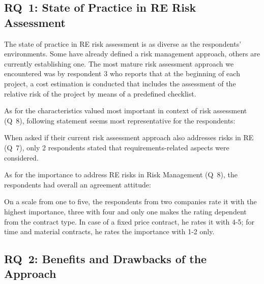 \documentclass[lnbip]{svmultln}
\begin{document}
\subsection{RQ~1: State of Practice in RE Risk Assessment}
The state of practice in RE risk assessment is as diverse as the respondents' environments. Some have already defined a risk management approach, others are currently establishing one. The most mature risk assessment approach we encountered was by respondent 3 who reports that at the beginning of each project, a cost estimation is conducted that includes the assessment of the relative risk of the project by means of a predefined checklist. 

As for the characteristics valued most important in context of risk assessment (Q~8), following statement seems most representative for the respondents:

\begin{center}
\setlength\fboxsep{0pt}
  \setlength\fboxrule{0pt}
\colorbox{lightgray}{
}
\end{center}

When asked if their current risk assessment approach also addresses risks in RE (Q~7), only 2 respondents stated that requirements-related aspects were considered. 


As for the importance to address RE risks in Risk Management (Q~8), the respondents had overall an agreement attitude: 

\begin{center}
\setlength\fboxsep{0pt}
  \setlength\fboxrule{0pt}
\colorbox{lightgray}{
}
\end{center}
On a scale from one to five, the respondents from two companies rate it with the highest importance, three with four and only one makes the rating dependent from the contract type. In case of a fixed price contract, he rates it with 4-5; for time and material contracts, he rates the importance with 1-2 only.

\subsection{RQ~2: Benefits and Drawbacks of the Approach}
\end{document}
